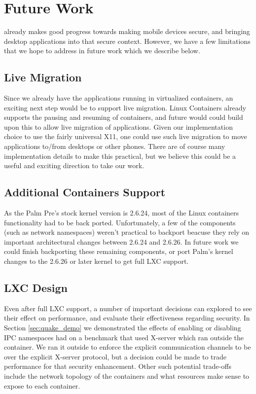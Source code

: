 \section{Future Work}
\label{sec:future}
    \emph{\proj} already makes good progress towards making mobile devices secure, and bringing desktop applications into that secure context.  However, we have a few limitations that we hope to address in future work which we describe below.
\subsection{Live Migration}
Since we already have the applications running in virtualized containers, an exciting next step would be to support live migration.  Linux Containers already supports the pausing and resuming of containers, and future would could build upon this to allow live migration of applications.  Given our implementation choice to use the fairly universal X11, one could use such live migration to move applications to/from desktops or other phones.  There are of course many implementation details to make this practical, but we believe this could be a useful and exciting direction to take our work.

\subsection{Additional Containers Support}
As the Palm Pre's stock kernel version is 2.6.24, most of the Linux containers functionality had to be back ported.  Unfortunately, a few of the components (such as network namespaces) weren't practical to backport beacuse they rely on important architectural changes between 2.6.24 and 2.6.26.  In future work we could finish backporting these remaining components, or port Palm's kernel changes to the 2.6.26 or later kernel to get full LXC support.

\subsection{LXC Design}
Even after full LXC support, a number of important decisions can explored to see their effect on performance, and evaluate their effectiveness regarding security.  In Section \ref{sec:quake_demo} we demonstrated the effects of enabling or disabling IPC namespaces had on a benchmark that used X-server which ran outside the container.  We ran it outside to enforce the explicit communication channels to be over the explicit X-server protocol, but a decision could be made to trade performance for that security enhancement.  Other such potential trade-offs include the network topology of the containers and what resources make sense to expose to each container.
